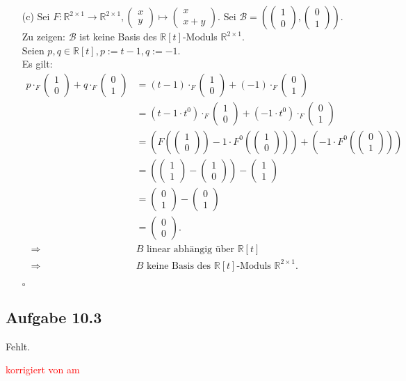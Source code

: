 \documentclass[12pt]{article}
\newcommand{\corr}[1]{\textcolor{red}{#1}}
\newcommand{\QED}{\begin{flushright} \mbox{$\square$} \end{flushright}}
\newcommand{\df}{\enspace\Longrightarrow\enspace}
\newcommand{\koeff}[2]{\begin{pmatrix}#1 \\ #2\end{pmatrix}}
\begin{document}
\begin{enumerate}
	\item[(c)] Sei $F:\mathbb{R}^{2\times1}\rightarrow\mathbb{R}^{2\times1},\koeff{x}{y}\mapsto\koeff{x}{x+y}$.
	Sei $\mathcal{B}=\left(\koeff{1}{0},\koeff{0}{1}\right)$. \\
	Zu zeigen: $\mathcal{B}$ ist keine Basis des $\mathbb{R}[t]$-Moduls $\mathbb{R}^{2\times1}$. \\
	Seien $p,q\in\mathbb{R}[t], p:=t-1,q:=-1$. \\
	Es gilt:
	\begin{align*}
		p\cdot_F\koeff{1}{0}+q\cdot_F\koeff{0}{1}&=(t-1)\cdot_F\koeff{1}{0}+(-1)\cdot_F\koeff{0}{1} \\
		&=(t-1\cdot t^0)\cdot_F\koeff{1}{0}+(-1\cdot t^0)\cdot_F\koeff{0}{1} \\
		&=\left(F(\koeff{1}{0})-1\cdot F^0(\koeff{1}{0})\right)+\left(-1\cdot F^0(\koeff{0}{1})\right) \\
		&=\left(\koeff{1}{1}-\koeff{1}{0}\right)-\koeff{1}{1} \\
		&=\koeff{0}{1}-\koeff{0}{1} \\
		&=\koeff{0}{0}. \\
		\df&B\text{ linear abhängig über }\mathbb{R}[t] \\
		\df&B\text{ keine Basis des }\mathbb{R}[t]\text{-Moduls }\mathbb{R}^{2\times1}.
	\end{align*}
	\QED
\end{enumerate}

\subsection*{Aufgabe 10.3}
Fehlt.


\bigskip

\corr{korrigiert von \hspace{1cm} am }
\end{document}

